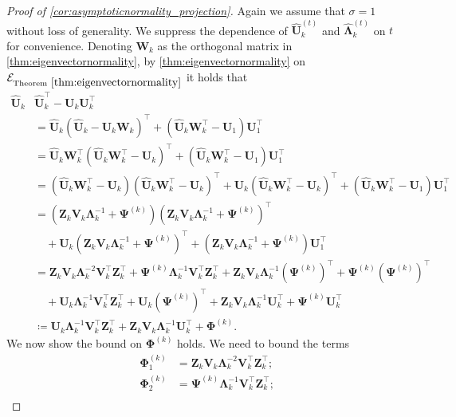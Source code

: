 \documentclass[10pt]{article}
\newcommand{\0}{{\mathbf{0}}}
\newcommand{\1}{{\mathbf{1}}}
\newcommand{\U}{{\mathbf{U}}}
\renewcommand{\t}{^{\top}}
\newcommand{\uhat}{\mathbf{\hat{U}}}
\newcommand{\inv}{^{-1}}
\renewcommand{\hat}{\widehat}
\renewcommand{\hat}{\widehat}
\begin{document}
\begin{proof}[Proof of \cref{cor:asymptoticnormality_projection}]
Again we assume that $\sigma = 1$ without loss of generality. We suppress the dependence of $\uhat_k^{(t)}$ and $\mathbf{\hat{\Lambda}}_k^{(t)}$ on $t$ for convenience.  Denoting $\mathbf{W}_k$ as the orthogonal matrix in \cref{thm:eigenvectornormality}, by \cref{thm:eigenvectornormality} on $\mathcal{E}_{\mathrm{Theorem} \ \ref{thm:eigenvectornormality}}$ it holds that
\begin{align*}
    \uhat_k &\uhat_k\t - \U_k \U_k\t \\
    &= \uhat_k (\uhat_k - \U_k \mathbf{W}_k )\t + (\uhat_k \mathbf{W}_k\t - \U_1)\U_1\t \\
    &= \uhat_k \mathbf{W}_k\t (\uhat_k \mathbf{W}_k\t - \U_k  )\t + (\uhat_k \mathbf{W}_k\t - \U_1)\U_1\t \\
    &= (\uhat_k \mathbf{W}_k\t -\U_k) (\uhat_k \mathbf{W}_k\t - \U_k  )\t +\U_k (\uhat_k \mathbf{W}_k\t - \U_k  )\t+ (\uhat_k \mathbf{W}_k\t - \U_1)\U_1\t \\
    &= (\mathbf{Z}_k \mathbf{V}_k \mathbf{\Lambda}_k\inv + \mathbf{\Psi}^{(k)}) (\mathbf{Z}_k \mathbf{V}_k \mathbf{\Lambda}_k\inv + \mathbf{\Psi}^{(k)})\t \\
    &\quad +\U_k (\mathbf{Z}_k \mathbf{V}_k \mathbf{\Lambda}_k\inv + \mathbf{\Psi}^{(k)}  )\t+ (\mathbf{Z}_k \mathbf{V}_k \mathbf{\Lambda}_k\inv + \mathbf{\Psi}^{(k)})\U_1\t \\
    &= \mathbf{Z}_k \mathbf{V}_k \mathbf{\Lambda}_k^{-2} \mathbf{V}_k\t \mathbf{Z}_k\t + \mathbf{\Psi}^{(k)} \mathbf{\Lambda}_k^{-1} \mathbf{V}_k\t \mathbf{Z}_k\t + \mathbf{Z}_k \mathbf{V}_k \mathbf{\Lambda}_k^{-1} (\mathbf{\Psi}^{(k)})\t + \mathbf{\Psi}^{(k)}(\mathbf{\Psi}^{(k)})\t\\
    &\quad + \U_k \mathbf{\Lambda}_k\inv \mathbf{V}_k\t \mathbf{Z}_k\t + \U_k (\mathbf{\Psi}^{(k)})\t  + \mathbf{Z}_k \mathbf{V}_k \mathbf{\Lambda}_k\inv \U_k\t + \mathbf{\Psi}^{(k)} \U_k\t \\
    &\coloneqq \U_k \mathbf{\Lambda}_k\inv \mathbf{V}_k\t \mathbf{Z}_k\t + \mathbf{Z}_k \mathbf{V}_k \mathbf{\Lambda}_k\inv \U_k\t + \mathbf{\Phi}^{(k)}.
\end{align*}
We now show the bound on $\mathbf{\Phi}^{(k)}$ holds.  We need to bound the terms
\begin{align*}
    \mathbf{\Phi}^{(k)}_1 &= \mathbf{Z}_k \mathbf{V}_k \mathbf{\Lambda}_k^{-2} \mathbf{V}_k\t \mathbf{Z}_k\t; \\
    \mathbf{\Phi}^{(k)}_2 &= \mathbf{\Psi}^{(k)}\mathbf{\Lambda}_k^{-1} \mathbf{V}_k\t \mathbf{Z}_k\t; \\

\end{align*}
\end{proof}
\end{document}
